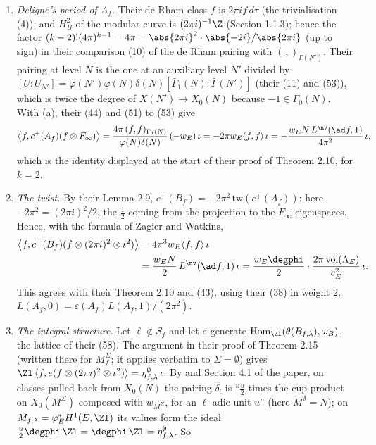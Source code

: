 \begin{remark}
\begin{enumerate}[label=(\alph*)]
$(f,f)_{\Gamma_1(N)}=\delta(N)N\varphi(N)L^{\nv}(A_f,1)/(16\pi^3)$, is therefore exactly $\langle f,f\rangle=N\,L^{\nv}(\ad f,1)/(8\pi^3)$, and their naive factors (Section 1.7.2) are ours
factor by factor.
\item \emph{Deligne's period of $A_f$.} Their de Rham class $f$ is $2\pi if\,d\tau$ (the trivialisation (4)), and $H^2_B$ of the modular curve is $(2\pi i)^{-1}\Z$ (Section 1.1.3); hence the
factor $(k-2)!(4\pi)^{k-1}=4\pi=\abs{2\pi i}^2\cdot\abs{-2i}/\abs{2\pi i}$ (up to sign) in their comparison (10) of the de Rham pairing with $(\,,)_{\Gamma(N')}$. Their pairing at level $N$ is the one at an auxiliary
level $N'$ divided by $[U:U_{N'}]=\varphi(N')\varphi(N)\delta(N)[\bar\Gamma_1(N):\bar\Gamma(N')]$ (their (11) and (53)), which is twice the degree of $X(N')\to X_0(N)$ because $-1\in\Gamma_0(N)$. With
(a), their (44) and (51) to (53) give
\[
\bigl\langle f,c^+(A_f)(f\otimes F_\infty)\bigr\rangle=\frac{4\pi\,(f,f)_{\Gamma_1(N)}}{\varphi(N)\delta(N)}\,(-w_E)\,\iota=-2\pi w_E\langle f,f\rangle\,\iota=-\frac{w_EN\,L^{\nv}(\ad f,1)}{4\pi^2}\,\iota,
\]
which is the identity displayed at the start of their proof of Theorem 2.10, for $k=2$.
\item \emph{The twist.} By their Lemma 2.9, $c^+(B_f)=-2\pi^2\,\mathrm{tw}(c^+(A_f))$; here $-2\pi^2=(2\pi i)^2/2$, the $\frac12$ coming from the projection to the $F_\infty$-eigenspaces. Hence, with the
formula of Zagier and Watkins,
\begin{align*}
\bigl\langle f,c^+(B_f)(f\otimes(2\pi i)^2\otimes\iota^2)\bigr\rangle&=4\pi^3w_E\langle f,f\rangle\,\iota\\
&=\frac{w_EN}2\,L^{\nv}(\ad f,1)\,\iota=\frac{w_E\degphi}2\cdot\frac{2\pi\operatorname{vol}(\Lambda_E)}{c_E^2}\,\iota.
\end{align*}
This agrees with their Theorem 2.10 and (43), using their (38) in weight $2$, $L(A_f,0)=\varepsilon(A_f)L(A_f,1)/(2\pi^2)$.
\item \emph{The integral structure.} Let $\ell\notin S_f$ and let $e$ generate $\operatorname{Hom}_{\Zl}(\theta(B_{f,\lambda}),\omega_B)$, the lattice of their (58). The argument in their proof of
Theorem 2.15 (written there for $M_f^\Sigma$; it applies verbatim to $\Sigma=\emptyset$) gives $\Zl\,\langle f,e(f\otimes(2\pi i)^2\otimes\iota^2)\rangle=\eta^\emptyset_{f,\lambda}\,\iota$. By
 and Section 4.1 of the paper, on classes pulled back from $X_0(N)$ the pairing $\hat\delta_!$ is ``$\frac u2$ times the cup product on $X_0(M^\Sigma)$ composed with $w_{M^\Sigma}$, for an $\ell$-adic unit $u$'' (here $M^\emptyset=N$); on $M_{f,\lambda}=\varphi_E^*H^1(E,\Zl)$ its values form the ideal $\frac u2\degphi\,\Zl=\degphi\,\Zl=\eta^\emptyset_{f,\lambda}$. So

\end{enumerate}
\end{remark}
